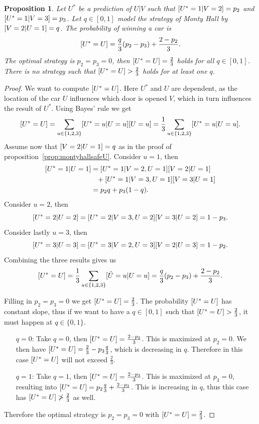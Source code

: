 \documentclass[twoside,a4paper]{article}
\theoremstyle{plain}
\newtheorem{proposition}[theorem]{Proposition}
\theoremstyle{definition}
\theoremstyle{remark}
\numberwithin{equation}{section}
\let\P\relax
\DeclareMathOperator{\P}{\mathbb{P}}
\DeclareMathOperator{\1}{\mathbbm{1}}
\newcommand{\Usafe}{\tilde{U}}
\begin{document}
\begin{proposition}\label{prop:MontyHallOpt}
Let $U^*$ be a prediction of $U|V$ such that $\P[U^*=1|V=2]=p_2$ and $\P[U^*=1|V=3]=p_3$. Let $q\in[0,1]$ model the strategy of Monty Hall by $\P[V=2|U=1]=q$. The probability of winning a car is
\[\P[U^*=U]=\frac{q}{3}(p_2-p_3)+\frac{2-p_2}{3}.\]
The optimal strategy is $p_2=p_3=0$, then $\P[U^*=U]=\frac{2}{3}$ holds for all $q\in[0,1]$. There is no strategy such that $\P[U^*=U]>\frac{2}{3}$ holds for at least one $q$.
\end{proposition}
\begin{proof}
We want to compute $\P[U^*=U]$. Here $U^*$ and $U$ are dependent, as the location of the car $U$ influences which door is opened $V$, which in turn influences the result of $U^*$. Using Bayes' rule we get
\[\P[U^*=U]=\sum_{u\in\{1,2,3\}}\P[U^*=u|U=u]\P[U=u]=\frac{1}{3}\sum_{u\in\{1,2,3\}}\P[U^*=u|U=u].\]
Assume now that $\P[V=2|U=1]=q$ as in the proof of proposition~\ref{prop:montyhallsafeU}. Consider $u=1$, then
\begin{align*}
\P[U^*=1|U=1]&=\P[U^*=1|V=2,U=1]\P[V=2|U=1]\\
&\phantom{=}+\P[U^*=1|V=3,U=1]\P[V=3|U=1]\\
&=p_2q+p_3(1-q).
\end{align*}
Consider $u=2$, then 
\[\P[U^*=2|U=2]=\P[U^*=2|V=3,U=2]\P[V=3|U=2]=1-p_3.\]
Consider lastly $u=3$, then
\[\P[U^*=3|U=3]=\P[U^*=3|V=2,U=3]\P[V=2|U=3]=1-p_2.\]
Combining the three results gives us
\[\P[U^*=U]=\frac{1}{3}\sum_{u\in\{1,2,3\}}\P[\Usafe=u|U=u]=\frac{q}{3}(p_2-p_3)+\frac{2-p_2}{3}.\]

Filling in $p_2=p_3=0$ we get $\P[U^*=U]=\frac{2}{3}$. The probability $\P[U^*=U]$ has constant slope, thus if we want to have a $q\in[0,1]$ such that $\P[U^*=U]>\frac{2}{3}$, it must happen at $q\in\{0,1\}$.
\begin{itemize}
	\item[$q=0$:] Take $q=0$, then $\P[U^*=U]=\frac{2-p_2}{3}$. This is maximized at $p_2=0$. We then have $\P[U^*=U]=\frac{2}{3}-p_3\frac{q}{3}$, which is decreasing in $q$. Therefore in this case $\P[U^*=U]$ will not exceed $\frac{2}{3}$.
	\item[$q=1$:] Take $q=1$, then $\P[U^*=U]=\frac{2-p_3}{3}$. This is maximized at $p_3=0$, resulting into $\P[U^*=U]=p_2\frac{q}{3}+\frac{2-p_2}{3}$. This is increasing in $q$, thus this case has $\P[U^*=U]\not>\frac{2}{3}$ as well.
\end{itemize}
Therefore the optimal strategy is $p_2=p_3=0$ with $\P[U^*=U]=\frac{2}{3}$.
\end{proof}
\end{document}
